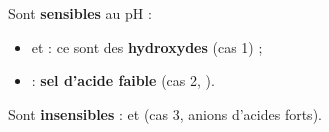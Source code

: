 \documentclass[11pt,a4paper]{article}
\begin{document}
\begin{corrige}
Sont \textbf{sensibles} au pH :
\begin{itemize}[leftmargin=1.6em,topsep=2pt,itemsep=1pt]
  \item {} et  : ce sont des \textbf{hydroxydes} (cas 1) ;
  \item {} : \textbf{sel d'acide faible} (cas 2, ).
\end{itemize}
Sont \textbf{insensibles} :  et  (cas 3, anions d'acides forts).
\end{corrige}
\end{document}
